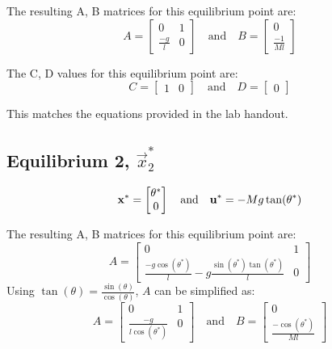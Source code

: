 \documentclass[10pt]{article}
\begin{document}
The resulting A, B matrices for this equilibrium point are:
\begin{equation*}
        A = 
        \begin{bmatrix}
        0 &1 \\ \frac{-g}{l} & 0
        \end{bmatrix}
        \quad
        \text{and}
        \quad
        B = 
        \begin{bmatrix}
        0\\ \frac{-1}{Ml}
        \end{bmatrix}
\end{equation*}

The C, D values for this equilibrium point are:
\begin{equation*}
    C = 
        \begin{bmatrix}
        1 & 0
        \end{bmatrix}
        \quad
        \text{and}
        \quad
        D = 
        \begin{bmatrix}
        0
        \end{bmatrix}
\end{equation*}

This matches the equations provided in the lab handout.
\subsection{Equilibrium 2, \texorpdfstring{$\vec{x}_2^*$}{x2*}}
\begin{equation*}
        \mathbf{x}^* =
     \begin{bmatrix} \theta^* \\ 0 \end{bmatrix}
     \quad
     \text{and}
     \quad
     \mathbf{u}^* = -Mg\tan(\theta^*) 
\end{equation*}

The resulting A, B matrices for this equilibrium point are:
\begin{equation*}
        A = 
        \begin{bmatrix}
        0 &1 \\ \frac{-g\cos(\theta^*)}{l} - g \frac{\sin(\theta^*) \tan(\theta^*)}{l} & 0
        \end{bmatrix}
\end{equation*}
Using $\tan(\theta) = \frac{\sin(\theta)}{\cos(\theta)}$, $A$ can be simplified as:
\begin{equation*}
        A =
        \begin{bmatrix}
        0 &1 \\ \frac{-g}{l\cos(\theta^*)} & 0
        \end{bmatrix}
        \quad
        \text{and}
        \quad
        B = 
        \begin{bmatrix}
            0\\ \frac{-\cos(\theta^*)}{Ml}
        \end{bmatrix}
\end{equation*}
\end{document}
